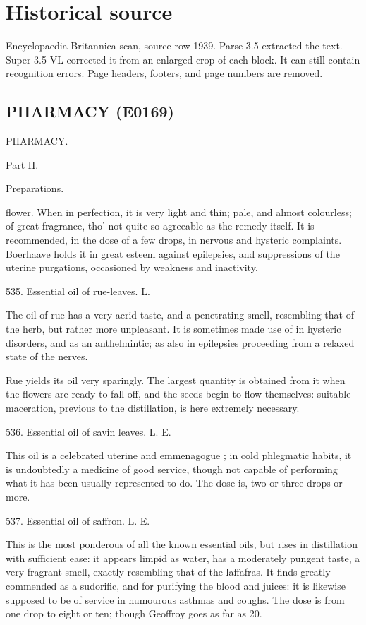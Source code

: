 \documentclass{article}
\begin{document}
\section*{Historical source}
Encyclopaedia Britannica scan, source row 1939. Parse 3.5 extracted the text. Super 3.5 VL corrected it from an enlarged crop of each block. It can still contain recognition errors.
Page headers, footers, and page numbers are removed.

\subsection*{PHARMACY (E0169)}
PHARMACY.

Part II.

Preparations.

flower. When in perfection, it is very light and thin; pale, and almost colourless; of great fragrance, tho' not quite so agreeable as the remedy itself. It is recommended, in the dose of a few drops, in nervous and hysteric complaints. Boerhaave holds it in great esteem against epilepsies, and suppressions of the uterine purgations, occasioned by weakness and inactivity.

535. Essential oil of rue-leaves. L.

The oil of rue has a very acrid taste, and a penetrating smell, resembling that of the herb, but rather more unpleasant. It is sometimes made use of in hysteric disorders, and as an anthelmintic; as also in epilepsies proceeding from a relaxed state of the nerves.

Rue yields its oil very sparingly. The largest quantity is obtained from it when the flowers are ready to fall off, and the seeds begin to flow themselves: suitable maceration, previous to the distillation, is here extremely necessary.

536. Essential oil of savin leaves. L. E.

This oil is a celebrated uterine and emmenagogue ; in cold phlegmatic habits, it is undoubtedly a medicine of good service, though not capable of performing what it has been usually represented to do. The dose is, two or three drops or more.

537. Essential oil of saffron. L. E.

This is the most ponderous of all the known essential oils, but rises in distillation with sufficient ease: it appears limpid as water, has a moderately pungent taste, a very fragrant smell, exactly resembling that of the laffafras. It finds greatly commended as a sudorific, and for purifying the blood and juices: it is likewise supposed to be of service in humourous asthmas and coughs. The dose is from one drop to eight or ten; though Geoffroy goes as far as 20.
\end{document}
